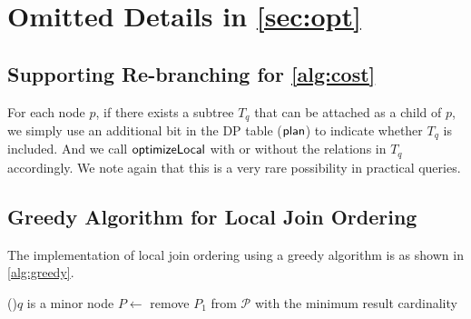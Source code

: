 \section{Omitted Details in \cref{sec:opt}}
\label{app:opt}

\subsection{Supporting Re-branching for \cref{alg:cost}}

For each node $p$, if there exists a subtree $T_q$ that can be attached as a child of $p$, we simply use an additional bit in the DP table ($\sf plan$) to indicate whether $T_q$ is included. And we call $\sf optimizeLocal$ with or without the relations in $T_q$ accordingly. We note again that this is a very rare possibility in practical queries.

\subsection{Greedy Algorithm for Local Join Ordering}
\label{app:greedy}

The implementation of local join ordering using a greedy algorithm is as shown in \cref{alg:greedy}.

\begin{algorithm}
\caption{Greedy implementation of $\sf optimizeLocal$}
\label{alg:greedy}

\If(){$q$ is a minor node}{
    $P \gets $ remove $P_1$ from $\mathcal{P}$ with the minimum result cardinality \;
} 


 \;

\end{algorithm}
